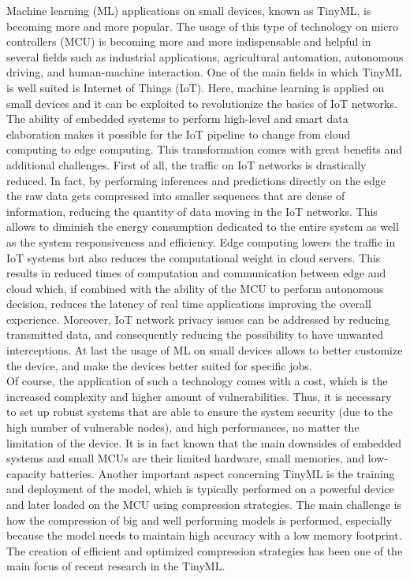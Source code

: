 \documentclass[12pt]{report}
\begin{document}
Machine learning (ML) applications on small devices, known as TinyML, is becoming more and more popular. The usage of this type of technology on micro controllers (MCU) is becoming more and more indispensable and helpful in several fields such as industrial applications, agricultural automation, autonomous driving, and human-machine interaction. One of the main fields in which TinyML is well suited is Internet of Things (IoT). Here, machine learning is applied on small devices and it can be exploited to revolutionize the basics of IoT networks.\\
The ability of embedded systems to perform high-level and smart data elaboration makes it possible for the IoT pipeline to change from cloud computing to edge computing. This transformation comes with great benefits and additional challenges.
First of all, the traffic on IoT networks is drastically reduced. In fact, by performing inferences and predictions directly on the edge the raw data gets compressed into smaller sequences that are dense of information, reducing the quantity of data moving in the IoT networks. This allows to diminish the energy consumption dedicated to the entire system as well as the system responsiveness and efficiency.
Edge computing lowers the traffic in IoT systems but also reduces the computational weight in cloud servers. This results in reduced times of computation and communication between edge and cloud which, if combined with the ability of the MCU to perform autonomous decision, reduces the latency of real time applications improving the overall experience.
Moreover, IoT network privacy issues can be addressed by reducing transmitted data, and consequently reducing the possibility to have unwanted interceptions.
At last the usage of ML on small devices allows to better customize the device, and make the devices better suited for specific jobs. \\
Of course, the application of such a technology comes with a cost, which is the increased complexity and higher amount of vulnerabilities. Thus, it is necessary to set up robust systems that are able to ensure the system security (due to the high number of vulnerable nodes), and high performances, no matter the limitation of the device. It is in fact known that the main downsides of embedded systems and small MCUs are their limited hardware, small memories, and low-capacity batteries. Another important aspect concerning TinyML is the training and deployment of the model, which is typically performed on a powerful device and later loaded on the MCU using compression strategies. The main challenge is how the compression of big and well performing models is performed, especially because the model needs to maintain high accuracy with a low memory footprint. The creation of efficient and optimized compression strategies has been one of the main focus of recent research in the TinyML. \\
\end{document}
